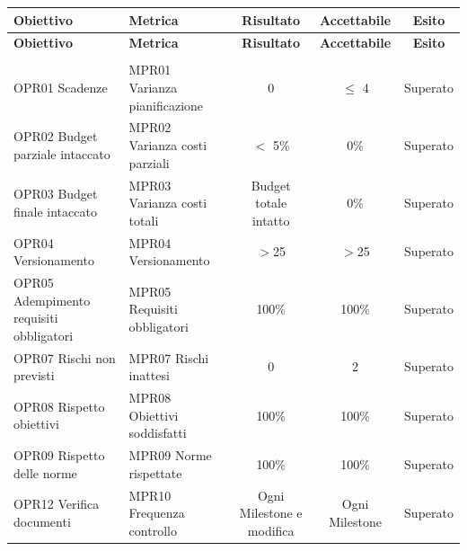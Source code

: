 \documentclass[../piano_di_qualifica.tex]{subfiles}
\begin{document}
\begin{center}
	\begin{longtable}{|p{4cm}|p{4cm}|c|c|c|}
		\hline
		\rowcolor{lightgray}
		\textbf{Obiettivo}                      & \textbf{Metrica}              & \textbf{Risultato}        & \textbf{Accettabile} & \textbf{Esito} \\
		\hline
		\endfirsthead

		\hline
		\rowcolor{lightgray}
		\textbf{Obiettivo}                      & \textbf{Metrica}              & \textbf{Risultato}        & \textbf{Accettabile} & \textbf{Esito} \\
		\hline
		\endhead

		\hline
		\rowcolor{white}
		\multicolumn{5}{|c|}{\emph{Continua alla pagina successiva...}}                                                                             \\
		\hline
		\endfoot
		\endlastfoot
		OPR01 Scadenze                          & MPR01 Varianza pianificazione & 0                         & $\leq$ 4             & Superato       \\
		OPR02 Budget parziale intaccato         & MPR02 Varianza costi parziali & $<$ 5\%                   & 0\%                  & Superato       \\
		OPR03 Budget finale intaccato           & MPR03 Varianza costi totali   & Budget totale intatto     & 0\%                  & Superato       \\
		OPR04 Versionamento                     & MPR04 Versionamento           & $>$25                     & $>$25                & Superato       \\
		OPR05 Adempimento requisiti obbligatori & MPR05 Requisiti obbligatori   & 100\%                     & 100\%                & Superato       \\
		OPR07 Rischi non previsti               & MPR07 Rischi inattesi         & 0                         & 2                    & Superato       \\
		OPR08 Rispetto obiettivi                & MPR08 Obiettivi soddisfatti   & 100\%                     & 100\%                & Superato       \\
		OPR09 Rispetto delle norme              & MPR09 Norme rispettate        & 100\%                     & 100\%                & Superato       \\
		OPR12 Verifica documenti                & MPR10 Frequenza controllo     & Ogni Milestone e modifica & Ogni Milestone       & Superato       \\

\end{longtable}
\end{center}
\end{document}
